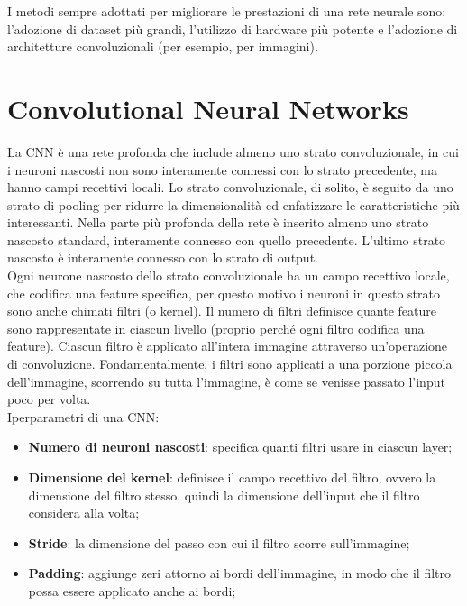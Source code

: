 I metodi sempre adottati per migliorare le prestazioni di una rete neurale sono:
l'adozione di dataset più grandi, l'utilizzo di hardware più potente e
l'adozione di architetture convoluzionali (per esempio, per immagini).

\section{Convolutional Neural Networks}

La CNN è una rete profonda che include almeno uno strato convoluzionale, in cui
i neuroni nascosti non sono interamente connessi con lo strato precedente, ma
hanno campi recettivi locali. 
Lo strato convoluzionale, di solito, è seguito da
uno strato di pooling per ridurre la dimensionalità ed enfatizzare le
caratteristiche più interessanti.
Nella parte più profonda della rete è inserito almeno uno strato nascosto
standard, interamente connesso con quello precedente.
L'ultimo strato nascosto è interamente connesso con lo strato di output.\\
Ogni neurone nascosto dello strato convoluzionale ha un campo recettivo locale,
che codifica una feature specifica, per questo motivo i neuroni in questo strato
sono anche chimati filtri (o kernel). Il numero di filtri definisce quante
feature sono rappresentate in ciascun livello (proprio perché ogni filtro
codifica una feature).
Ciascun filtro è applicato all'intera immagine attraverso un'operazione di
convoluzione. Fondamentalmente, i filtri sono applicati a una porzione piccola
dell'immagine, scorrendo su tutta l'immagine, è come se venisse passato l'input
poco per volta.\\

Iperparametri di una CNN:
\begin{itemize}
	\item \textbf{Numero di neuroni nascosti}: specifica quanti filtri usare in
		ciascun layer;
	
	\item \textbf{Dimensione del kernel}: definisce il campo recettivo del
		filtro, ovvero la dimensione del filtro stesso, quindi la dimensione
		dell'input che il filtro considera alla volta;

	\item \textbf{Stride}: la dimensione del passo con cui il filtro scorre
		sull'immagine;

	\item \textbf{Padding}: aggiunge zeri attorno ai bordi dell'immagine, in
		modo che il filtro possa essere applicato anche ai bordi;
\end{itemize}

